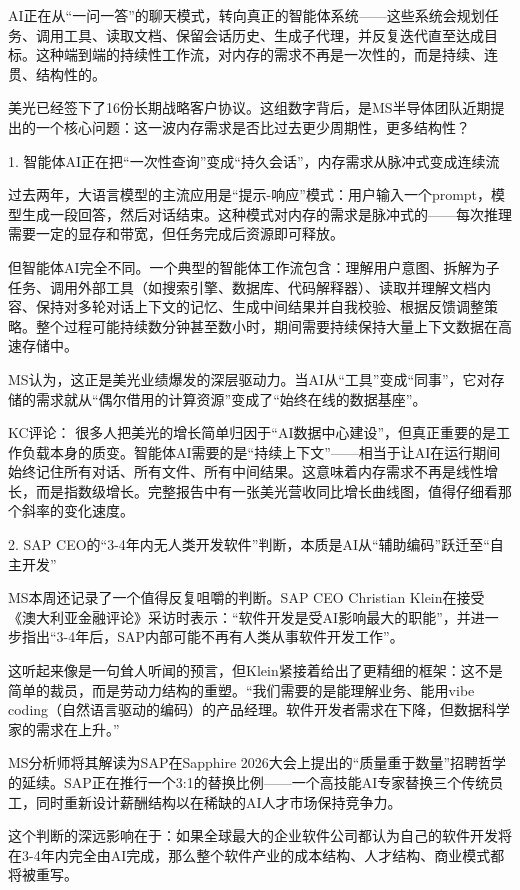 \documentclass[11pt]{ctexart}
\begin{document}
AI正在从“一问一答”的聊天模式，转向真正的智能体系统——这些系统会规划任务、调用工具、读取文档、保留会话历史、生成子代理，并反复迭代直至达成目标。这种端到端的持续性工作流，对内存的需求不再是一次性的，而是持续、连贯、结构性的。

美光已经签下了16份长期战略客户协议。这组数字背后，是MS半导体团队近期提出的一个核心问题：这一波内存需求是否比过去更少周期性，更多结构性？

1. 智能体AI正在把“一次性查询”变成“持久会话”，内存需求从脉冲式变成连续流

过去两年，大语言模型的主流应用是“提示-响应”模式：用户输入一个prompt，模型生成一段回答，然后对话结束。这种模式对内存的需求是脉冲式的——每次推理需要一定的显存和带宽，但任务完成后资源即可释放。

但智能体AI完全不同。一个典型的智能体工作流包含：理解用户意图、拆解为子任务、调用外部工具（如搜索引擎、数据库、代码解释器）、读取并理解文档内容、保持对多轮对话上下文的记忆、生成中间结果并自我校验、根据反馈调整策略。整个过程可能持续数分钟甚至数小时，期间需要持续保持大量上下文数据在高速存储中。

MS认为，这正是美光业绩爆发的深层驱动力。当AI从“工具”变成“同事”，它对存储的需求就从“偶尔借用的计算资源”变成了“始终在线的数据基座”。

KC评论： 很多人把美光的增长简单归因于“AI数据中心建设”，但真正重要的是工作负载本身的质变。智能体AI需要的是“持续上下文”——相当于让AI在运行期间始终记住所有对话、所有文件、所有中间结果。这意味着内存需求不再是线性增长，而是指数级增长。完整报告中有一张美光营收同比增长曲线图，值得仔细看那个斜率的变化速度。

2. SAP CEO的“3-4年内无人类开发软件”判断，本质是AI从“辅助编码”跃迁至“自主开发”

MS本周还记录了一个值得反复咀嚼的判断。SAP CEO Christian Klein在接受《澳大利亚金融评论》采访时表示：“软件开发是受AI影响最大的职能”，并进一步指出“3-4年后，SAP内部可能不再有人类从事软件开发工作”。

这听起来像是一句耸人听闻的预言，但Klein紧接着给出了更精细的框架：这不是简单的裁员，而是劳动力结构的重塑。“我们需要的是能理解业务、能用vibe coding（自然语言驱动的编码）的产品经理。软件开发者需求在下降，但数据科学家的需求在上升。”

MS分析师将其解读为SAP在Sapphire 2026大会上提出的“质量重于数量”招聘哲学的延续。SAP正在推行一个3:1的替换比例——一个高技能AI专家替换三个传统员工，同时重新设计薪酬结构以在稀缺的AI人才市场保持竞争力。

这个判断的深远影响在于：如果全球最大的企业软件公司都认为自己的软件开发将在3-4年内完全由AI完成，那么整个软件产业的成本结构、人才结构、商业模式都将被重写。
\end{document}
